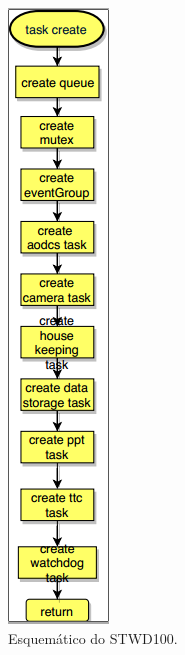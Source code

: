 \begin{apendicesenv}
\begin{figure}[!h]
	\centerfloat
	\centering
	\includegraphics[keepaspectratio=true,scale=0.5]{figuras/flowChart_taskCreate.PNG}
	\caption{Esquemático do STWD100.}
	\label{flowChart_taskCreate}
\end{figure}


\end{apendicesenv}
